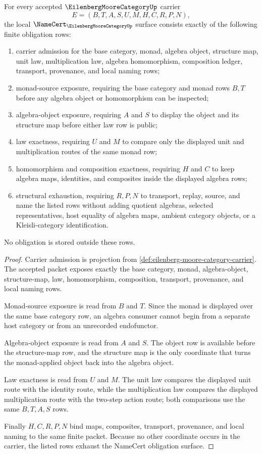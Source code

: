\begin{theorem}
\label{thm:eilenberg-moore-category-namecert-obligations}
For every accepted $\EilenbergMooreCategoryUp$ carrier
$$
E=(B,T,A,S,U,M,H,C,R,P,N),
$$
the local $\NameCert_{\EilenbergMooreCategoryUp}$ surface consists exactly of the following finite obligation rows:
\begin{enumerate}
\item carrier admission for the base category, monad, algebra object, structure map, unit law, multiplication law, algebra homomorphism, composition ledger, transport, provenance, and local naming rows;
\item monad-source exposure, requiring the base category and monad rows $B,T$ before any algebra object or homomorphism can be inspected;
\item algebra-object exposure, requiring $A$ and $S$ to display the object and its structure map before either law row is public;
\item law exactness, requiring $U$ and $M$ to compare only the displayed unit and multiplication routes of the same monad row;
\item homomorphism and composition exactness, requiring $H$ and $C$ to keep algebra maps, identities, and composites inside the displayed algebra rows;
\item structural exhaustion, requiring $R,P,N$ to transport, replay, source, and name the listed rows without adding quotient algebras, selected representatives, host equality of algebra maps, ambient category objects, or a Kleisli-category identification.
\end{enumerate}
No obligation is stored outside these rows.
\end{theorem}
\begin{proof}
Carrier admission is projection from \autoref{def:eilenberg-moore-category-carrier}. The accepted packet exposes exactly the base category, monad, algebra-object, structure-map, law, homomorphism, composition, transport, provenance, and local naming rows.

Monad-source exposure is read from $B$ and $T$. Since the monad is displayed over the same base category row, an algebra consumer cannot begin from a separate host category or from an unrecorded endofunctor.

Algebra-object exposure is read from $A$ and $S$. The object row is available before the structure-map row, and the structure map is the only coordinate that turns the monad-applied object back into the algebra object.

Law exactness is read from $U$ and $M$. The unit law compares the displayed unit route with the identity route, while the multiplication law compares the displayed multiplication route with the two-step action route; both comparisons use the same $B,T,A,S$ rows.

Finally $H,C,R,P,N$ bind maps, composites, transport, provenance, and local naming to the same finite packet. Because no other coordinate occurs in the carrier, the listed rows exhaust the NameCert obligation surface.
\end{proof}


